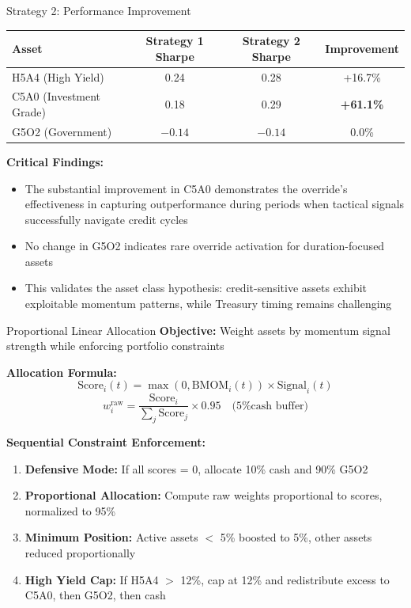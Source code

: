 \documentclass[aspectratio=169,10pt]{beamer}
\begin{document}
\begin{frame}{Strategy 2: Performance Improvement}
\begin{center}
\begin{tabular}{lccc}
\toprule
\textbf{Asset} & \textbf{Strategy 1 Sharpe} & \textbf{Strategy 2 Sharpe} & \textbf{Improvement} \\
\midrule
H5A4 (High Yield) & 0.24 & 0.28 & +16.7\% \\
C5A0 (Investment Grade) & 0.18 & 0.29 & \textbf{+61.1\%} \\
G5O2 (Government) & $-0.14$ & $-0.14$ & 0.0\% \\
\bottomrule
\end{tabular}
\end{center}

\vspace{0.4cm}

\textbf{Critical Findings:}
\begin{itemize}
    \item The substantial improvement in C5A0 demonstrates the override's effectiveness in capturing outperformance during periods when tactical signals successfully navigate credit cycles

    \item No change in G5O2 indicates rare override activation for duration-focused assets

    \item This validates the asset class hypothesis: credit-sensitive assets exhibit exploitable momentum patterns, while Treasury timing remains challenging
\end{itemize}
\end{frame}

\begin{frame}{Proportional Linear Allocation}
\textbf{Objective:} Weight assets by momentum signal strength while enforcing portfolio constraints

\vspace{0.2cm}

\textbf{Allocation Formula:}
$$\text{Score}_i(t) = \max(0, \text{BMOM}_i(t)) \times \text{Signal}_i(t)$$
\vspace{-0.1cm}
$$w_i^{\text{raw}} = \frac{\text{Score}_i}{\sum_j \text{Score}_j} \times 0.95 \quad \text{(5\% cash buffer)}$$

\vspace{0.2cm}

\textbf{Sequential Constraint Enforcement:}
\begin{enumerate}
    \item \textbf{Defensive Mode:} If all scores = 0, allocate 10\% cash and 90\% G5O2
    \item \textbf{Proportional Allocation:} Compute raw weights proportional to scores, normalized to 95\%
    \item \textbf{Minimum Position:} Active assets $<$ 5\% boosted to 5\%, other assets reduced proportionally
    \item \textbf{High Yield Cap:} If H5A4 $>$ 12\%, cap at 12\% and redistribute excess to C5A0, then G5O2, then cash
\end{enumerate}
\end{frame}
\end{document}

